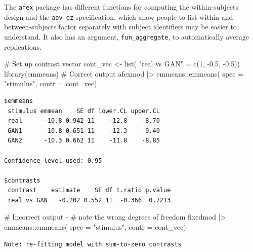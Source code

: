\documentclass[
  11pt,
  letterpaper,
]{scrbook}
\newenvironment{Shaded}{\begin{snugshade}}{\end{snugshade}}
\newcommand{\AttributeTok}[1]{\textcolor[rgb]{0.40,0.45,0.13}{#1}}
\newcommand{\CommentTok}[1]{\textcolor[rgb]{0.37,0.37,0.37}{#1}}
\newcommand{\DecValTok}[1]{\textcolor[rgb]{0.68,0.00,0.00}{#1}}
\newcommand{\FloatTok}[1]{\textcolor[rgb]{0.68,0.00,0.00}{#1}}
\newcommand{\FunctionTok}[1]{\textcolor[rgb]{0.28,0.35,0.67}{#1}}
\newcommand{\NormalTok}[1]{\textcolor[rgb]{0.00,0.23,0.31}{#1}}
\newcommand{\OtherTok}[1]{\textcolor[rgb]{0.00,0.23,0.31}{#1}}
\newcommand{\SpecialCharTok}[1]{\textcolor[rgb]{0.37,0.37,0.37}{#1}}
\newcommand{\StringTok}[1]{\textcolor[rgb]{0.13,0.47,0.30}{#1}}
\theoremstyle{definition}
\theoremstyle{remark}
\begin{document}
The \texttt{afex} package has different functions for computing the
within-subjects design and the \texttt{aov\_ez} specification, which
allow people to list within and between-subjects factor separately with
subject identifiers may be easier to understand. It also has an
argument, \texttt{fun\_aggregate}, to automatically average
replications.

\begin{Shaded}
\begin{Highlighting}[]
\CommentTok{\# Set up contrast vector}
\NormalTok{cont\_vec }\OtherTok{\textless{}{-}} \FunctionTok{list}\NormalTok{(}
  \StringTok{"real vs GAN"} \OtherTok{=} \FunctionTok{c}\NormalTok{(}\DecValTok{1}\NormalTok{, }\SpecialCharTok{{-}}\FloatTok{0.5}\NormalTok{, }\SpecialCharTok{{-}}\FloatTok{0.5}\NormalTok{))}
\FunctionTok{library}\NormalTok{(emmeans)}
\CommentTok{\# Correct output}
\NormalTok{afexmod }\SpecialCharTok{|\textgreater{}}
\NormalTok{  emmeans}\SpecialCharTok{::}\FunctionTok{emmeans}\NormalTok{(}
    \AttributeTok{spec =} \StringTok{"stimulus"}\NormalTok{, }
    \AttributeTok{contr =}\NormalTok{ cont\_vec)}
\end{Highlighting}
\end{Shaded}

\begin{verbatim}
$emmeans
 stimulus emmean    SE df lower.CL upper.CL
 real      -10.8 0.942 11    -12.8    -8.70
 GAN1      -10.8 0.651 11    -12.3    -9.40
 GAN2      -10.3 0.662 11    -11.8    -8.85

Confidence level used: 0.95 

$contrasts
 contrast    estimate    SE df t.ratio p.value
 real vs GAN   -0.202 0.552 11  -0.366  0.7213
\end{verbatim}

\begin{Shaded}
\begin{Highlighting}[]
\CommentTok{\# Incorrect output {-} }
\CommentTok{\# note the wrong degrees of freedom}
\NormalTok{fixedmod }\SpecialCharTok{|\textgreater{}} 
\NormalTok{  emmeans}\SpecialCharTok{::}\FunctionTok{emmeans}\NormalTok{(}
    \AttributeTok{spec =} \StringTok{"stimulus"}\NormalTok{, }
    \AttributeTok{contr =}\NormalTok{ cont\_vec)}
\end{Highlighting}
\end{Shaded}

\begin{verbatim}
Note: re-fitting model with sum-to-zero contrasts
\end{verbatim}
\end{document}
